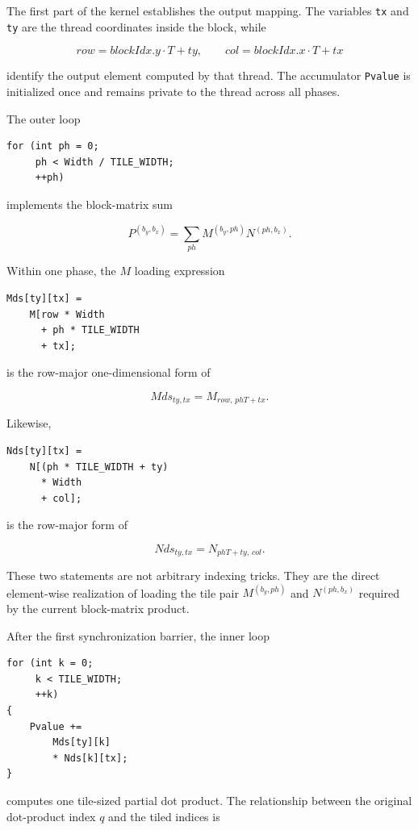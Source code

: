 \documentclass[11pt,a4paper]{article}
\begin{document}
The first part of the kernel establishes the output mapping. The variables \texttt{tx} and \texttt{ty} are the thread coordinates inside the block, while

\[
row = blockIdx.y\cdot T + ty,
\qquad
col = blockIdx.x\cdot T + tx
\]

identify the output element computed by that thread. The accumulator \texttt{Pvalue} is initialized once and remains private to the thread across all phases.

The outer loop

\begin{lstlisting}
for (int ph = 0;
     ph < Width / TILE_WIDTH;
     ++ph)
\end{lstlisting}

implements the block-matrix sum

\[
P^{(b_y,b_x)}
=
\sum_{ph}
M^{(b_y,ph)}N^{(ph,b_x)}.
\]

Within one phase, the $M$ loading expression

\begin{lstlisting}
Mds[ty][tx] =
    M[row * Width
      + ph * TILE_WIDTH
      + tx];
\end{lstlisting}

is the row-major one-dimensional form of

\[
Mds_{ty,tx}
=
M_{row,\,phT+tx}.
\]

Likewise,

\begin{lstlisting}
Nds[ty][tx] =
    N[(ph * TILE_WIDTH + ty)
      * Width
      + col];
\end{lstlisting}

is the row-major form of

\[
Nds_{ty,tx}
=
N_{phT+ty,\,col}.
\]

These two statements are not arbitrary indexing tricks. They are the direct element-wise realization of loading the tile pair $M^{(b_y,ph)}$ and $N^{(ph,b_x)}$ required by the current block-matrix product.

After the first synchronization barrier, the inner loop

\begin{lstlisting}
for (int k = 0;
     k < TILE_WIDTH;
     ++k)
{
    Pvalue +=
        Mds[ty][k]
        * Nds[k][tx];
}
\end{lstlisting}

computes one tile-sized partial dot product. The relationship between the original dot-product index $q$ and the tiled indices is
\end{document}

